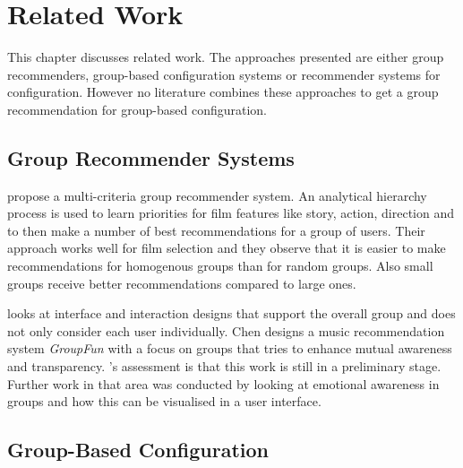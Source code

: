 \chapter{Related Work}
\label{ch:Related_Work}

This chapter discusses related work. The approaches presented are either group recommenders, group-based configuration systems or recommender systems for configuration. However no literature combines these approaches to get a group recommendation for group-based configuration.

\section{Group Recommender Systems}
\label{sec:Related_Work:GroupRecommender}

\begin{description}[style=unboxed, leftmargin=0cm, font=\normalfont]
    \item[\citeauthor{choudharyMulticriteriaGroupRecommender2020} \cite{choudharyMulticriteriaGroupRecommender2020}] propose a multi-criteria group recommender system. An analytical hierarchy process is used to learn priorities for film features like story, action, direction and to then make a number of best recommendations for a group of users. Their approach works well for film selection and they observe that it is easier to make recommendations for homogenous groups than for random groups. Also small groups receive better recommendations compared to large ones.

    \item[\citeauthor{chenInterfaceInteractionDesign2011} \cite{chenInterfaceInteractionDesign2011}] looks at interface and interaction designs that support the overall group and does not only consider each user individually. Chen designs a music recommendation system \emph{GroupFun} with a focus on groups that tries to enhance mutual awareness and transparency. \citeauthor{chenInterfaceInteractionDesign2011}'s assessment is that this work is still in a preliminary stage. Further work in that area was conducted by \citeauthor{chenEmpatheticonsDesigningEmotion2014} \cite{chenEmpatheticonsDesigningEmotion2014} looking at emotional awareness in groups and how this can be visualised in a user interface. 
\end{description}

\section{Group-Based Configuration}
\label{sec:Related_Work:GroupBasedConfiguration}

